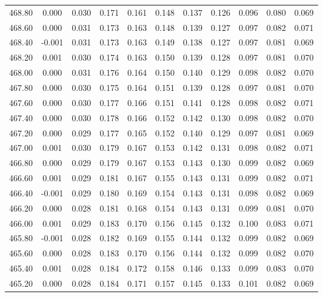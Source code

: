 \begin{longtable}{cccccccccc}
    468.80 &  0.000 &  0.030 &  0.171 &  0.161 &  0.148 &  0.137 &  0.126 &  0.096 &  0.080 &  0.069 \\
    468.60 &  0.000 &  0.031 &  0.173 &  0.163 &  0.148 &  0.139 &  0.127 &  0.097 &  0.082 &  0.071 \\
    468.40 & -0.001 &  0.031 &  0.173 &  0.163 &  0.149 &  0.138 &  0.127 &  0.097 &  0.081 &  0.069 \\
    468.20 &  0.001 &  0.030 &  0.174 &  0.163 &  0.150 &  0.139 &  0.128 &  0.097 &  0.081 &  0.070 \\
    468.00 &  0.000 &  0.031 &  0.176 &  0.164 &  0.150 &  0.140 &  0.129 &  0.098 &  0.082 &  0.070 \\
    467.80 &  0.000 &  0.030 &  0.175 &  0.164 &  0.151 &  0.139 &  0.128 &  0.097 &  0.081 &  0.070 \\
    467.60 &  0.000 &  0.030 &  0.177 &  0.166 &  0.151 &  0.141 &  0.128 &  0.098 &  0.082 &  0.071 \\
    467.40 &  0.000 &  0.030 &  0.178 &  0.166 &  0.152 &  0.142 &  0.130 &  0.098 &  0.082 &  0.070 \\
    467.20 &  0.000 &  0.029 &  0.177 &  0.165 &  0.152 &  0.140 &  0.129 &  0.097 &  0.081 &  0.069 \\
    467.00 &  0.001 &  0.030 &  0.179 &  0.167 &  0.153 &  0.142 &  0.131 &  0.098 &  0.082 &  0.071 \\
    466.80 &  0.000 &  0.029 &  0.179 &  0.167 &  0.153 &  0.143 &  0.130 &  0.099 &  0.082 &  0.069 \\
    466.60 &  0.001 &  0.029 &  0.181 &  0.167 &  0.155 &  0.143 &  0.131 &  0.099 &  0.082 &  0.071 \\
    466.40 & -0.001 &  0.029 &  0.180 &  0.169 &  0.154 &  0.143 &  0.131 &  0.098 &  0.082 &  0.069 \\
    466.20 &  0.000 &  0.028 &  0.181 &  0.168 &  0.154 &  0.143 &  0.131 &  0.099 &  0.081 &  0.070 \\
    466.00 &  0.001 &  0.029 &  0.183 &  0.170 &  0.156 &  0.145 &  0.132 &  0.100 &  0.083 &  0.071 \\
    465.80 & -0.001 &  0.028 &  0.182 &  0.169 &  0.155 &  0.144 &  0.132 &  0.099 &  0.082 &  0.069 \\
    465.60 &  0.000 &  0.028 &  0.183 &  0.170 &  0.156 &  0.144 &  0.132 &  0.099 &  0.082 &  0.070 \\
    465.40 &  0.001 &  0.028 &  0.184 &  0.172 &  0.158 &  0.146 &  0.133 &  0.099 &  0.083 &  0.070 \\
    465.20 &  0.000 &  0.028 &  0.184 &  0.171 &  0.157 &  0.145 &  0.133 &  0.101 &  0.082 &  0.069 \\

\end{longtable}
